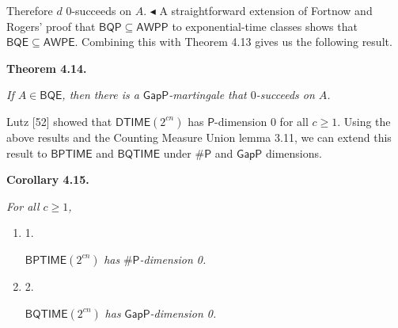 Therefore $d$ $0$-succeeds on $A$.
$\blacktriangleleft$
A straightforward extension of Fortnow and Rogers’ proof that $\mathsf{BQP}\subseteq\mathsf{AWPP}$ to exponential-time classes shows that
$\mathsf{BQE}\subseteq\mathsf{AWPE}$.
Combining this with Theorem 4.13 gives us the following result.\par





\par\medskip\noindent\textbf{
\textbf{Theorem 4.14}\textbf{.}
}\par



\emph{If $A\in\mathsf{BQE}$, then there is a $\mathsf{GapP}$-martingale that $0$-succeeds on $A$.}\par






Lutz [52] showed that $\mathsf{DTIME}(2^{cn})$ has $\mathsf{P}$-dimension 0 for all $c\geq 1$.
Using the above results and the Counting Measure Union lemma 3.11, we can extend this result to $\mathsf{BPTIME}$ and $\mathsf{BQTIME}$ under ${\mathsf{\#}\mathsf{P}}$ and $\mathsf{GapP}$ dimensions.\par





\par\medskip\noindent\textbf{
\textbf{Corollary 4.15}\textbf{.}
}\par



\emph{For all $c\geq 1$,}\par


\begin{enumerate}


\item[] 
1. 


$\mathsf{BPTIME}(2^{cn})$\emph{ has }${\mathsf{\#}\mathsf{P}}$\emph{-dimension 0.}\par





\item[] 
2. 


$\mathsf{BQTIME}(2^{cn})$\emph{ has }$\mathsf{GapP}$\emph{-dimension 0.}\par





\end{enumerate}



